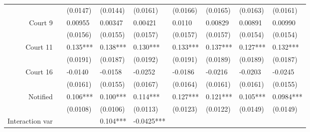 \begin{tabular}{rrrrrrrrr}
      & \multicolumn{1}{l}{} & \multicolumn{1}{l}{(0.0147)} & \multicolumn{1}{l}{(0.0144)} & \multicolumn{1}{l}{(0.0161)} & \multicolumn{1}{l}{(0.0166)} & \multicolumn{1}{l}{(0.0165)} & \multicolumn{1}{l}{(0.0163)} & \multicolumn{1}{l}{(0.0161)} \\
Court 9 & \multicolumn{1}{l}{} & \multicolumn{1}{l}{0.00955} & \multicolumn{1}{l}{0.00347} & \multicolumn{1}{l}{0.00421} & \multicolumn{1}{l}{0.0110} & \multicolumn{1}{l}{0.00829} & \multicolumn{1}{l}{0.00891} & \multicolumn{1}{l}{0.00990} \\
      & \multicolumn{1}{l}{} & \multicolumn{1}{l}{(0.0156)} & \multicolumn{1}{l}{(0.0155)} & \multicolumn{1}{l}{(0.0157)} & \multicolumn{1}{l}{(0.0157)} & \multicolumn{1}{l}{(0.0157)} & \multicolumn{1}{l}{(0.0154)} & \multicolumn{1}{l}{(0.0154)} \\
Court 11 & \multicolumn{1}{l}{} & \multicolumn{1}{l}{0.135***} & \multicolumn{1}{l}{0.138***} & \multicolumn{1}{l}{0.130***} & \multicolumn{1}{l}{0.133***} & \multicolumn{1}{l}{0.137***} & \multicolumn{1}{l}{0.127***} & \multicolumn{1}{l}{0.132***} \\
      & \multicolumn{1}{l}{} & \multicolumn{1}{l}{(0.0191)} & \multicolumn{1}{l}{(0.0187)} & \multicolumn{1}{l}{(0.0192)} & \multicolumn{1}{l}{(0.0191)} & \multicolumn{1}{l}{(0.0189)} & \multicolumn{1}{l}{(0.0189)} & \multicolumn{1}{l}{(0.0187)} \\
Court 16 & \multicolumn{1}{l}{} & \multicolumn{1}{l}{-0.0140} & \multicolumn{1}{l}{-0.0158} & \multicolumn{1}{l}{-0.0252} & \multicolumn{1}{l}{-0.0186} & \multicolumn{1}{l}{-0.0216} & \multicolumn{1}{l}{-0.0203} & \multicolumn{1}{l}{-0.0245} \\
      & \multicolumn{1}{l}{} & \multicolumn{1}{l}{(0.0161)} & \multicolumn{1}{l}{(0.0155)} & \multicolumn{1}{l}{(0.0167)} & \multicolumn{1}{l}{(0.0164)} & \multicolumn{1}{l}{(0.0161)} & \multicolumn{1}{l}{(0.0161)} & \multicolumn{1}{l}{(0.0155)} \\
Notified & \multicolumn{1}{l}{} & \multicolumn{1}{l}{0.106***} & \multicolumn{1}{l}{0.100***} & \multicolumn{1}{l}{0.114***} & \multicolumn{1}{l}{0.127***} & \multicolumn{1}{l}{0.121***} & \multicolumn{1}{l}{0.105***} & \multicolumn{1}{l}{0.0984***} \\
      & \multicolumn{1}{l}{} & \multicolumn{1}{l}{(0.0108)} & \multicolumn{1}{l}{(0.0106)} & \multicolumn{1}{l}{(0.0113)} & \multicolumn{1}{l}{(0.0123)} & \multicolumn{1}{l}{(0.0122)} & \multicolumn{1}{l}{(0.0149)} & \multicolumn{1}{l}{(0.0149)} \\
Interaction var & \multicolumn{1}{l}{} & \multicolumn{1}{l}{} & \multicolumn{1}{l}{0.104***} & \multicolumn{1}{l}{-0.0425***} & \multicolumn{1}{l}{} & \multicolumn{1}{l}{} & \multicolumn{1}{l}{} & \multicolumn{1}{l}{} \\

\end{tabular}
